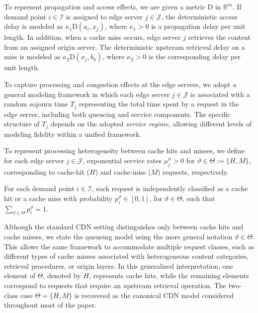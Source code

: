 \documentclass[a4paper,11pt,reqno]{amsart}
\newcommand{\R}{\mathbb{R}}
\newcommand{\I}{\mathcal{I}}
\newcommand{\J}{\mathcal{J}}
\newcommand{\D}{\mathrm{D}}
\begin{document}
To represent propagation and access effects, we are given a metric $\D$ in $\R^m$.
If demand point $i\in\I$ is assigned to edge server $j\in\J$, the deterministic
access delay is modeled as $\kappa_1 \D(a_i,x_j)$, where $\kappa_1>0$ is a propagation delay per unit length.
In addition, when a cache miss occurs, edge server $j$ retrieves the content from
an assigned origin server.
The deterministic upstream retrieval delay on a miss is modeled as
$\kappa_2 \D(x_j,b_k)$, where $\kappa_2>0$ is the corresponding delay per unit length.

To capture processing and congestion effects at the edge servers, we adopt a general modeling framework in which each edge server $j\in\J$ is associated with a random sojourn time $T_j$ representing the total time spent by a request in the edge server, including both queueing and service components. The specific structure of $T_j$ depends on the adopted \emph{service regime}, allowing different levels of modeling fidelity within a unified framework.

To represent processing heterogeneity between cache hits and misses, we define for each edge server $j\in\J$, exponential service rates
$\mu^\vartheta_j>0$ for $\vartheta \in \Theta:=\{H, M\}$, corresponding to cache-hit ($H$) and cache-miss ($M$) requests, respectively.

For each demand point $i\in\I$, each request is independently classified as a cache hit or a cache miss with probability $p_i^\vartheta\in[0,1]$, for $\vartheta \in \Theta$, such that $\sum_{\vartheta \in \Theta} p^\vartheta_i = 1$.

Although the standard CDN setting distinguishes only between cache hits and cache misses,
we state the queueing model using the more general notation $\vartheta\in\Theta$. This
allows the same framework to accommodate multiple request classes, such as different
types of cache misses associated with heterogeneous content categories, retrieval
procedures, or origin layers. In this generalized interpretation, one element of $\Theta$,
denoted by $H$, represents cache hits, while the remaining elements correspond to
requests that require an upstream retrieval operation. The two-class case
$\Theta=\{H,M\}$ is recovered as the canonical CDN model considered throughout most of
the paper.
\end{document}
